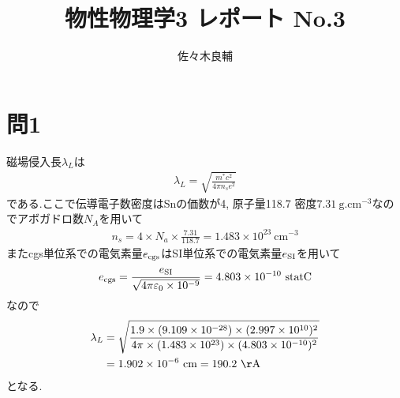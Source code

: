 \documentclass[uplatex,a4j,11pt,dvipdfmx]{jsarticle}
\begin{document}
\title{物性物理学3 レポート No.3}
\author{佐々木良輔}
\date{}
\maketitle
\section*{問1}
磁場侵入長$\lambda_L$は
\begin{align}
  \lambda_L=\sqrt{\frac{m^*c^2}{4\pi n_se^2}}
\end{align}
である.ここで伝導電子数密度はSnの価数が4, 原子量118.7 密度$7.31\ \si{\gram.\centi\metre^{-3}}$なのでアボガドロ数$N_A$を用いて
\begin{align}
  n_s=4\times N_a\times\frac{7.31}{118.7}=1.483\times10^{23}\ \si{\centi\metre^{-3}}
\end{align}
またcgs単位系での電気素量$e_{\rm cgs}$はSI単位系での電気素量$e_{\rm SI}$を用いて
\begin{align}
  e_{\rm cgs}=\frac{e_{\rm SI}}{\sqrt{4\pi\varepsilon_0\times10^{-9}}}=4.803\times10^{-10}\ \si{statC}
\end{align}
なので
\begin{align}
  \begin{split}
    \lambda_L&=\sqrt{\frac{1.9\times(9.109\times10^{-28})\times(2.997\times10^{10})^2}{4\pi\times(1.483\times10^{23})\times(4.803\times10^{-10})^2}}\\
    &=1.902\times10^{-6}\ \si{\centi\metre}=190.2\ {\rm\AA}
  \end{split}
\end{align}
となる.\cite{rika:online}
\end{document}
